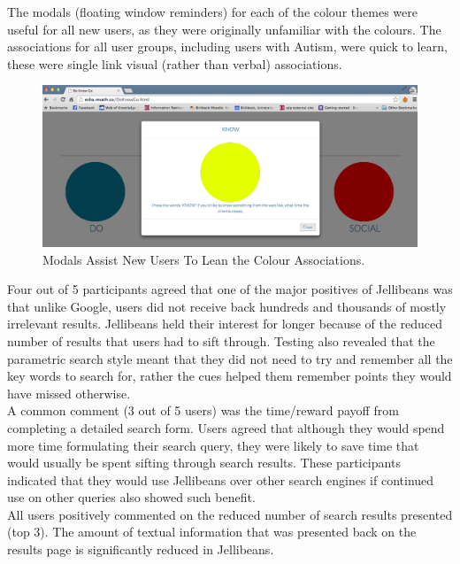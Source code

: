\documentclass[a4paper, 11pt]{article}
\begin{document}
The modals (floating window reminders) for each of the colour themes were useful for all new users, as they were originally unfamiliar with the colours. The associations for all user groups, including users with Autism, were quick to learn, these were single link visual (rather than verbal) associations.\\

\begin{figure}[H]
\begin{center}
\includegraphics[scale=0.25]{floatingModals}
\caption{Modals Assist New Users To Lean the Colour Associations.}
\label{colourCoding}
\end{center}
\end{figure}


Four out of 5 participants agreed that one of the major positives of Jellibeans was that unlike Google, users did not receive back hundreds and thousands of mostly irrelevant results. Jellibeans held their interest for longer because of the reduced number of results that users had to sift through. Testing also revealed that the parametric search style meant that they did not need to try and remember all the key words to search for, rather the cues helped them remember points they would have missed otherwise. \\

\vspace{5mm}
A common comment (3 out of 5 users) was the time/reward payoff from completing a detailed search form. Users agreed that although they would spend more time formulating their search query, they were likely to save time that would usually be spent sifting through search results. These participants indicated that they would use Jellibeans over other search engines if continued use on other queries also showed such benefit.\\

\vspace{5mm}
All users positively commented on the reduced number of search results presented (top 3). The amount of textual information that was presented back on the results page is significantly reduced in Jellibeans. 
\end{document}
